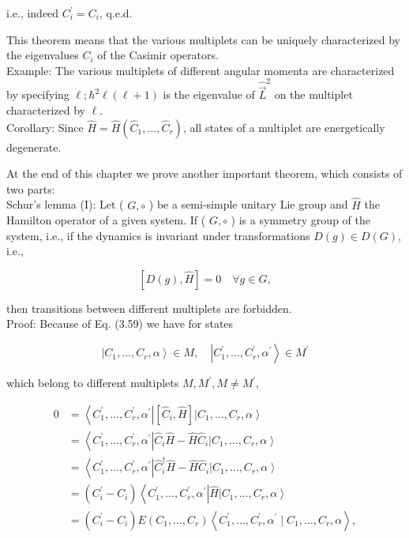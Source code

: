 \documentclass[10pt, letterpaper]{article}
\begin{document}
i.e., indeed $C_{i}^{\prime}=C_{i}$, q.e.d.

This theorem means that the various multiplets can be uniquely characterized by the eigenvalues $C_{i}$ of the Casimir operators.\\
Example: The various multiplets of different angular momenta are characterized by specifying $\ell ; \hbar^{2} \ell(\ell+1)$ is the eigenvalue of $\hat{\vec{L}}^{2}$ on the multiplet characterized by $\ell$.\\
Corollary: Since $\hat{H}=\hat{H}\left(\hat{C}_{1}, \ldots, \hat{C}_{r}\right)$, all states of a multiplet are energetically degenerate.

At the end of this chapter we prove another important theorem, which consists of two parts:\\
Schur's lemma (I): Let ( $G, \circ$ ) be a semi-simple unitary Lie group and $\hat{H}$ the Hamilton operator of a given system. If ( $G, \circ$ ) is a symmetry group of the system, i.e., if the dynamics is invariant under transformations $D(g) \in D(G)$, i.e.,

$$
[D(g), \hat{H}]=0 \quad \forall g \in G,
$$

then transitions between different multiplets are forbidden.\\
Proof: Because of Eq. (3.59) we have for states

$$
\left|C_{1}, \ldots, C_{r}, \alpha\right\rangle \in M, \quad\left|C_{1}^{\prime}, \ldots, C_{r}^{\prime}, \alpha^{\prime}\right\rangle \in M^{\prime}
$$

which belong to different multiplets $M, M^{\prime}, M \neq M^{\prime}$,

$$
\begin{aligned}
0 & =\left\langle C_{1}^{\prime}, \ldots, C_{r}^{\prime}, \alpha^{\prime}\right|\left[\hat{C}_{i}, \hat{H}\right]\left|C_{1}, \ldots, C_{r}, \alpha\right\rangle \\
& =\left\langle C_{1}^{\prime}, \ldots, C_{r}^{\prime}, \alpha^{\prime}\right| \hat{C}_{i} \hat{H}-\hat{H} \hat{C}_{i}\left|C_{1}, \ldots, C_{r}, \alpha\right\rangle \\
& =\left\langle C_{1}^{\prime}, \ldots, C_{r}^{\prime}, \alpha^{\prime}\right| \hat{C}_{i}^{\dagger} \hat{H}-\hat{H} \hat{C}_{i}\left|C_{1}, \ldots, C_{r}, \alpha\right\rangle \\
& =\left(C_{i}^{\prime}-C_{i}\right)\left\langle C_{1}^{\prime}, \ldots, C_{r}^{\prime}, \alpha^{\prime}\right| \hat{H}\left|C_{1}, \ldots, C_{r}, \alpha\right\rangle \\
& =\left(C_{i}^{\prime}-C_{i}\right) E\left(C_{1}, \ldots, C_{r}\right)\left\langle C_{1}^{\prime}, \ldots, C_{r}^{\prime}, \alpha^{\prime} \mid C_{1}, \ldots, C_{r}, \alpha\right\rangle,
\end{aligned}
$$
\end{document}
